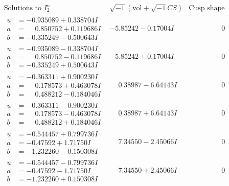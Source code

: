 \documentclass[1p]{elsarticle_modified}
\theoremstyle{definition}
\newcommand{\I}{\sqrt{-1}}
\begin{document}
$$\begin{array}{c|c|c}  
\text{Solutions to }I^u_{2}& \I (\text{vol} + \sqrt{-1}CS) & \text{Cusp shape}\\
 \hline 
\begin{aligned}
u &= -0.935089 + 0.338704 I \\
a &= \phantom{-}0.850752 + 0.119686 I \\
b &= -0.335249 - 0.500643 I\end{aligned}
 & -5.85242 - 0.17004 I & \phantom{-0.000000 } 0 \\ \hline\begin{aligned}
u &= -0.935089 - 0.338704 I \\
a &= \phantom{-}0.850752 - 0.119686 I \\
b &= -0.335249 + 0.500643 I\end{aligned}
 & -5.85242 + 0.17004 I & \phantom{-0.000000 } 0 \\ \hline\begin{aligned}
u &= -0.363311 + 0.900230 I \\
a &= \phantom{-}0.178573 + 0.463078 I \\
b &= \phantom{-}0.488212 - 0.184046 I\end{aligned}
 & \phantom{-}0.38987 - 6.64143 I & \phantom{-0.000000 } 0 \\ \hline\begin{aligned}
u &= -0.363311 - 0.900230 I \\
a &= \phantom{-}0.178573 - 0.463078 I \\
b &= \phantom{-}0.488212 + 0.184046 I\end{aligned}
 & \phantom{-}0.38987 + 6.64143 I & \phantom{-0.000000 } 0 \\ \hline\begin{aligned}
u &= -0.544457 + 0.799736 I \\
a &= -0.47592 + 1.71750 I \\
b &= -1.232260 - 0.150308 I\end{aligned}
 & \phantom{-}7.34550 - 2.45066 I & \phantom{-0.000000 } 0 \\ \hline\begin{aligned}
u &= -0.544457 - 0.799736 I \\
a &= -0.47592 - 1.71750 I \\
b &= -1.232260 + 0.150308 I\end{aligned}
 & \phantom{-}7.34550 + 2.45066 I & \phantom{-0.000000 } 0 \\ \hline\begin{aligned}

\end{aligned}
\end{array}$$
\end{document}
